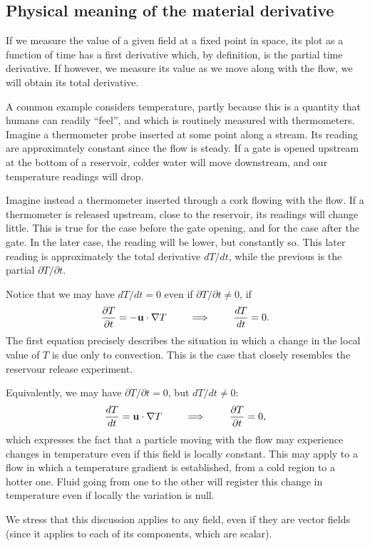 \subsection{Physical meaning of the material derivative}

If we measure the value of a given field at a fixed point in space,
its plot as a function of time has a first derivative which, by
definition, is the partial time derivative. If however, we measure
its value as we move along with the flow, we will obtain its total
derivative.

A common example considers temperature, partly because this is a
quantity that humans can readily ``feel'', and which is routinely
measured with thermometers. Imagine a thermometer probe inserted at
some point along a stream. Its reading are approximately constant
since the flow is steady. If a gate is opened upstream at the bottom
of a reservoir, colder water will move downstream, and our temperature
readings will drop.

Imagine instead a thermometer inserted through a cork flowing with the
flow. If a thermometer is released upstream, close to the reservoir,
its readings will change little. This is true for the case before the
gate opening, and for the case after the gate. In the later case, the
reading will be lower, but constantly so. This later reading is
approximately the total derivative $dT/dt$, while the previous is the
partial $\partial T / \partial t$.

Notice that we may have $dT/dt = 0$ even if $\partial T / \partial t
\ne 0$, if
\[
\frac{\partial T }{ \partial t} = - \mathbf{u} \cdot \nabla T
\qquad\implies\qquad
\frac{d T }{d t} = 0 .
\]
The first equation precisely describes the situation in which a change
in the local value of $T$ is due only to convection. This is the
case that closely resembles the reservour release experiment.

Equivalently, we may have $\partial T / \partial t = 0$, but $dT/dt
\ne 0$:
\[
\frac{d T }{d t} = \mathbf{u} \cdot \nabla T
\qquad\implies\qquad
\frac{\partial T }{\partial t} = 0 ,
\]
which expresses the fact that a particle moving with the flow may
experience changes in temperature even if this field is locally
constant. This may apply to a flow in which a temperature gradient is
established, from a cold region to a hotter one. Fluid going from one
to the other will register this change in temperature even if
locally the variation is null.

We stress that this discussion applies to any field, even if they
are vector fields
(since it applies to each of its components, which are scalar).

